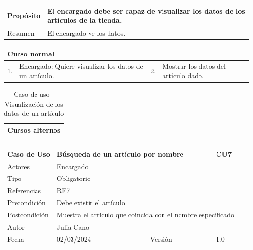 \begin{table}[H]
	\centering
	\begin{tabular}{| m{} | m{} | m{} | m{} |}
		\hline
		Propósito & \multicolumn{3}{m{0.67\textwidth}|}{El encargado debe ser capaz de visualizar los datos de los artículos de la tienda.}   \\ 
		\hline
		Resumen & \multicolumn{3}{m{0.67\textwidth}|}{El encargado ve los datos.} \\ 
		\hline
	\end{tabular}
\end{table}


\begin{table}[H]
	\centering
	\begin{tabular}{| m{} | m{} | m{} | m{} |}
		\hline
		\multicolumn{4}{|m{0.9\textwidth}|}{Curso normal}     \\ 
		\hline
		1. & Encargado: Quiere visualizar los datos de un artículo. & 2. &  Mostrar los datos del artículo dado.  \\ 
		\hline
	\end{tabular}
\end{table}

\begin{table}[H]
	\centering
	\begin{tabular}{| m{} | m{} | m{} | m{} |}
		\hline
		\multicolumn{4}{|m{0.9\textwidth}|}{Cursos alternos}     \\ 
		\hline
		& \multicolumn{3}{m{0.67\textwidth}|}{} \\ 
		\hline
	\end{tabular}
	\caption{Caso de uso - Visualización de los datos de un artículo}
\end{table}

\newpage


\begin{table}[H]
	\centering
	\begin{tabular}{| m{} | m{} | m{} | m{}|}
		\hline
		\rowcolor{grayshade} Caso de Uso & \multicolumn{2}{|m{0.43\textwidth}|}{Búsqueda de un artículo por nombre} &  CU7\\ 
		\hline
		Actores & \multicolumn{3}{l|}{Encargado} \\ 
		\hline
		Tipo & \multicolumn{3}{l|}{Obligatorio} \\ 
		\hline
		Referencias & \multicolumn{3}{l|}{RF7} \\ 
		\hline
		Precondición & \multicolumn{3}{m{0.67\textwidth}|}{Debe existir el artículo.} \\ 
		\hline
		Postcondición & \multicolumn{3}{m{0.67\textwidth}|}{Muestra el artículo que coincida con el nombre especificado.} \\ 
		\hline
		Autor & \multicolumn{3}{l|}{Julia Cano} \\ 
		\hline
		Fecha & 02/03/2024 & Versión & 1.0 \\
		\hline
	\end{tabular}
\end{table}

